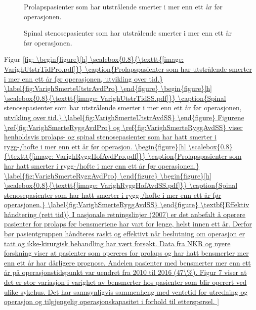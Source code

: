\documentclass [norsk,a4paper,twoside]{article}\usepackage[]{graphicx}\usepackage[]{color}
\begin{document}
\begin{figure}[h] 
      \caption{Prolapspasienter som har utstrålende smerter i mer enn ett år før operasjonen.}
      \label{fig:VarighSmerteUtstrAvdPro}
\end{figure}

\begin{figure}[h] 
      \caption{Spinal stenosepasienter som har utstrålende smerter i mer enn ett år før operasjonen.}
      \label{fig:VarighSmerteUtstrAvdSS}
\end{figure}

Figur \ref{fig: 
\begin{figure}[h] 
      \scalebox{0.8}{\texttt{[image: VarighUtstrTidPro.pdf]}}
      \caption{Prolapspasienter som har utstrålende smerter i mer enn ett år før operasjonen, utvikling over tid.}
      \label{fig:VarighSmerteUtstrAvdPro}
\end{figure}

\begin{figure}[h] 
      \scalebox{0.8}{\texttt{[image: VarighUtstrTidSS.pdf]}}
      \caption{Spinal stenosepasienter som har utstrålende smerter i mer enn ett år før operasjonen, utvikling over tid.}
      \label{fig:VarighSmerteUtstrAvdSS}
\end{figure}

Figurene \ref{fig:VarighSmerteRyggAvdPro} og \ref{fig:VarighSmerteRyggAvdSS} viser henholdsvis prolaps- og spinal stenosepasienter som har hatt smerter i rygg-/hofte i mer enn ett år før operasjon.


\begin{figure}[h] 
\scalebox{0.8}{\texttt{[image: VarighRyggHofAvdPro.pdf]}}
\caption{Prolapspasienter som har hatt smerter i rygg-/hofte
i mer enn ett år før operasjonen.}
\label{fig:VarighSmerteRyggAvdPro}
\end{figure}
\begin{figure}[h] 
\scalebox{0.8}{\texttt{[image: VarighRyggHofAvdSS.pdf]}}
\caption{Spinal stenosepasienter som har hatt smerter i rygg-/hofte
i mer enn ett år før operasjonen.}
\label{fig:VarighSmerteRyggAvdSS}
\end{figure}


\textbf{Effektiv håndtering (rett tid)}

I nasjonale retningslinjer (2007) er det anbefalt å operere pasienter for prolaps før
bensmertene har vart for lenge, helst innen ett år. Derfor bør
pasientgruppen håndteres raskt og effektivt når beslutning om operasjon er tatt og
ikke-kirurgisk behandling har vært forsøkt. Data fra NKR og nyere forskning viser at
pasienter som opereres for prolaps og har hatt bensmerter mer enn ett år har
dårligere prognose. Andelen pasienter med bensmerter mer enn ett år på
operasjonstidspunkt var uendret fra 2010 til 2016 (47\%).
Figur 7 viser at det er stor variasjon i varighet av bensmerter hos pasienter som blir
operert ved ulike sykehus. Det har sannsynligvis sammenheng med ventetid for
utredning og operasjon og tilgjengelig operasjonskapasitet i forhold til etterspørsel.


}
\end{document}

